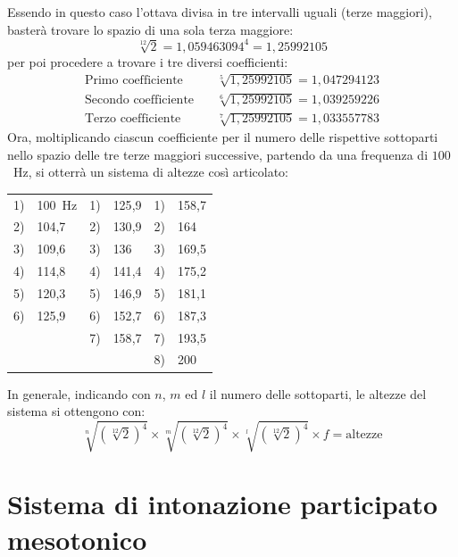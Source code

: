 Essendo in questo caso l'ottava divisa in tre intervalli uguali (terze
maggiori), basterà trovare lo spazio di una sola terza maggiore:
\[
  \sqrt[12]{2} = 1{,}059463094^{4} = 1{,}25992105
\]
per poi procedere a trovare i tre diversi coefficienti:
\begin{align*}
  \text{Primo coefficiente}   &\quad \sqrt[5]{1{,}25992105} = 1{,}047294123 \\
  \text{Secondo coefficiente} &\quad \sqrt[6]{1{,}25992105} = 1{,}039259226 \\
  \text{Terzo coefficiente}   &\quad \sqrt[7]{1{,}25992105} = 1{,}033557783
\end{align*}
Ora, moltiplicando ciascun coefficiente per il numero delle rispettive
sottoparti nello spazio delle tre terze maggiori successive, partendo da una
frequenza di $100$~Hz, si otterrà un sistema di altezze così articolato:

\begin{center}\small
\begin{tabular}{r l@{\quad}r l@{\quad}r l}
1) & 100~Hz & 1) & 125{,}9 & 1) & 158{,}7 \\
2) & 104{,}7 & 2) & 130{,}9 & 2) & 164     \\
3) & 109{,}6 & 3) & 136     & 3) & 169{,}5 \\
4) & 114{,}8 & 4) & 141{,}4 & 4) & 175{,}2 \\
5) & 120{,}3 & 5) & 146{,}9 & 5) & 181{,}1 \\
6) & 125{,}9 & 6) & 152{,}7 & 6) & 187{,}3 \\
   &         & 7) & 158{,}7 & 7) & 193{,}5 \\
   &         &    &         & 8) & 200     \\
\end{tabular}
\end{center}

In generale, indicando con $n$, $m$ ed $l$ il numero delle sottoparti, le
altezze del sistema si ottengono con:
\[
  \sqrt[n]{\left(\sqrt[12]{2}\right)^{4}} \times
  \sqrt[m]{\left(\sqrt[12]{2}\right)^{4}} \times
  \sqrt[l]{\left(\sqrt[12]{2}\right)^{4}} \times f = \text{altezze}
\]

\section{Sistema di intonazione participato mesotonico}

